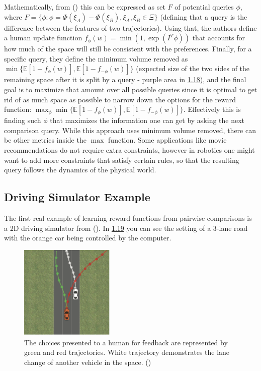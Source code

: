 \documentclass[
  letterpaper,
  DIV=11,
  numbers=noendperiod,
  oneside]{scrreprt}
\theoremstyle{remark}
\begin{document}
Mathematically, from () this can be expressed as set \(F\) of potential queries \(\phi\),
where
\(F = \{\phi: \phi = \Phi(\xi_A) - \Phi(\xi_B), \xi_A, \xi_B \in \Xi\}\)
(defining that a query is the difference between the features of two
trajectories). Using that, the authors define a human update function
\(f_{\phi}(w) = \min(1, \exp(I^T\phi))\) that accounts for how much of
the space will still be consistent with the preferences. Finally, for a
specific query, they define the minimum volume removed as
\(\min\{\mathbb{E}[1 - f_{\phi}(w)], \mathbb{E}[1 - f_{-\phi}(w)]\}\)
(expected size of the two sides of the remaining space after it is split
by a query - purple area in \hyperref[fig:2dspace]{1.18}), and the final
goal is to maximize that amount over all possible queries since it is
optimal to get rid of as much space as possible to narrow down the
options for the reward function:
\(\max_{\phi} \min\{ \mathbb{E}[1 - f_{\phi}(w)], \mathbb{E}[1 - f_{-\phi}(w)]\}\).
Effectively this is finding such \(\phi\) that maximizes the information
one can get by asking the next comparison query. While this approach
uses minimum volume removed, there can be other metrics inside the
\(\max\) function. Some applications like movie recommendations do not
require extra constraints, however in robotics one might want to add
more constraints that satisfy certain rules, so that the resulting query
follows the dynamics of the physical world.

\subsection{Driving Simulator Example}\label{driving-simulator-example}

The first real example of learning reward functions from pairwise
comparisons is a 2D driving simulator from
(). In
\hyperref[fig:car_direct]{1.19} you can see the setting of a 3-lane road
with the orange car being controlled by the computer.

\begin{figure}

{\centering \includegraphics[width=0.4\textwidth,height=\textheight]{src/Figures/car_dir.png}

}

\caption{The choices presented to a human for feedback are represented
by green and red trajectories. White trajectory demonstrates the lane
change of another vehicle in the space.
()}

\end{figure}%
\end{document}

